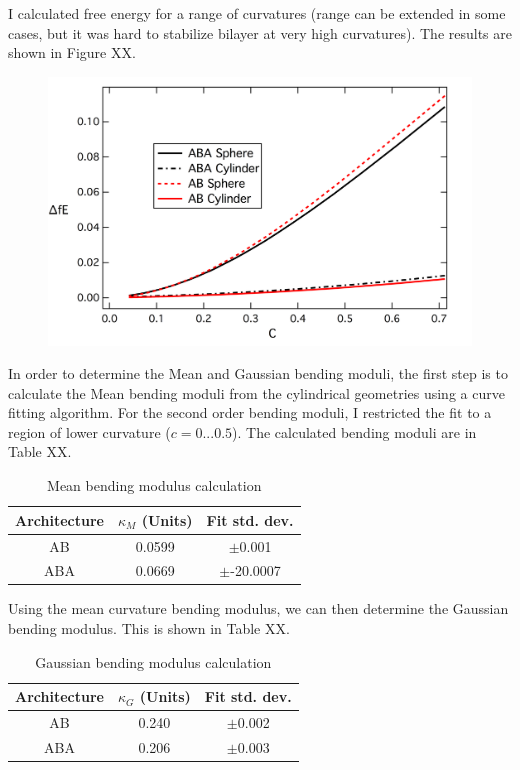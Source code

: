 \documentclass[11pt]{article} %
\begin{document}
I calculated free energy for a range of curvatures (range can be extended in some cases, but it was hard to stabilize bilayer at very high curvatures). The results are shown in Figure XX.

\begin{figure}[H]
\centering
\includegraphics[scale=0.6]{BendingdfE}
\centering
\end{figure}

In order to determine the Mean and Gaussian bending moduli, the first step is to calculate the Mean bending moduli from the cylindrical geometries using a curve fitting algorithm. For the second order bending moduli, I restricted the fit to a region of lower curvature ($c=0...0.5$). The calculated bending moduli are in Table XX.

\begin{table}[H]
\centering
\begin{center}
\begin{tabular}[c]{| c | c | c |}
\hline
Architecture &$\kappa_M$ (Units) &Fit std. dev. \\
\hline
AB 	&0.0599 &$\pm$0.001\\
ABA	&0.0669 &$\pm$-20.0007 \\
\hline
\end{tabular}
\end{center}
\caption{\small{Mean bending modulus calculation}}
\end{table}

Using the mean curvature bending modulus, we can then determine the Gaussian bending modulus. This is shown in Table XX.

\begin{table}[H]
\centering
\begin{center}
\begin{tabular}[c]{| c | c | c |}
\hline
Architecture &$\kappa_G$ (Units) &Fit std. dev. \\
\hline
AB 	&0.240 &$\pm$0.002 \\
ABA	&0.206 &$\pm$0.003\\
\hline
\end{tabular}
\end{center}
\caption{\small{Gaussian bending modulus calculation}}
\end{table}
\end{document}
